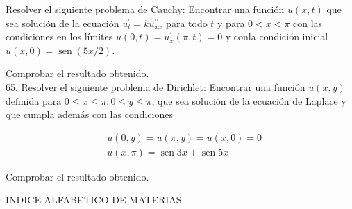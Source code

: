 \documentclass[10pt]{article}
\theoremstyle{plain}
\theoremstyle{definition}
\theoremstyle{remark}
\begin{document}
Resolver el siguiente problema de Cauchy: Encontrar una función $u(x, t)$ que sea solución de la ecuación $u_{t}^{\prime}=k u_{x x}^{\prime \prime}$ para todo $t$ y para $0<x<\pi$ con las condiciones en los límites $u(0, t)=u_{x}^{\prime}(\pi, t)=0$ y conla condición inicial $u(x, 0)=\operatorname{sen}(5 x / 2)$.

Comprobar el resultado obtenido.\\
65. Resolver el siguiente problema de Dirichlet: Encontrar una función $u(x, y)$ definida para $0 \leqslant x \leqslant \pi ; 0 \leqslant y \leqslant \pi$, que sea solución de la ecuación de Laplace y que cumpla además con las condiciones

$$
\begin{aligned}
& u(0, y)=u(\pi, y)=u(x, 0)=0 \\
& u(x, \pi)=\operatorname{sen} 3 x+\operatorname{sen} 5 x
\end{aligned}
$$

Comprobar el resultado obtenido.

INDICE ALFABETICO DE MATERIAS
\end{document}

